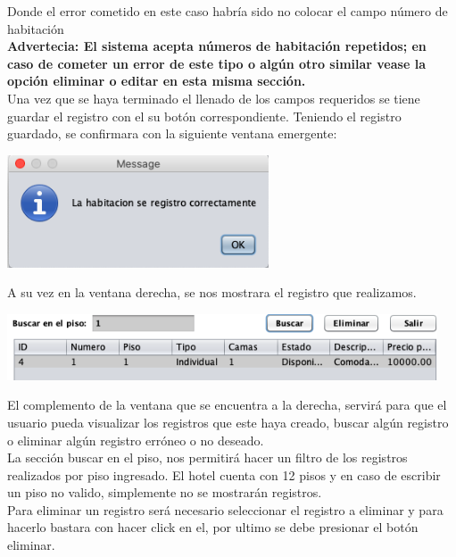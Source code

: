 \documentclass[12pt]{article}
\begin{document}
\begin{flushleft}
\begin{center}
\end{center}
\textsf{Donde el error cometido en este caso habría sido no colocar el campo número de habitación\\}
\vspace{0.5cm}
\textbf{Advertecia: El sistema acepta números de habitación repetidos; en caso de cometer un error de este tipo o algún otro similar vease la opción eliminar o editar en esta misma sección.\\}
\vspace{0.5cm}
\textsf{Una vez que se haya terminado el llenado de los campos requeridos se tiene guardar el registro con el su botón correspondiente. Teniendo el registro guardado, se confirmara con la siguiente ventana emergente: }
\vspace{0.5cm}
\begin{center}
\includegraphics[width=7.75cm]{4.png}
\end{center}
\textsf{A su vez en la ventana derecha, se nos mostrara el registro que realizamos.}
\vspace{0.5cm}
\begin{center}
\includegraphics[width=12.75cm]{3.png}
\end{center}
\textsf{El complemento de la ventana que se encuentra a la derecha, servirá para que el usuario pueda visualizar los registros que este haya creado, buscar algún registro o eliminar algún registro erróneo o no deseado.\vspace{0.5cm} \\La sección buscar en el piso, nos permitirá hacer un filtro de los registros realizados por piso ingresado. El hotel cuenta con 12 pisos y en caso de escribir un piso no valido, simplemente no se mostrarán registros.\vspace{0.5cm} \\Para eliminar un registro será necesario seleccionar el registro a eliminar y para hacerlo bastara con hacer click en el, por ultimo se debe presionar el botón eliminar.}

\end{flushleft}
\end{document}
